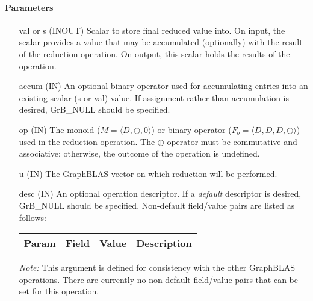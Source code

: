 \paragraph{Parameters}

\begin{itemize}[leftmargin=1.1in]
    \item[{\sf val} or {\sf s}] ({\sf INOUT}) Scalar to store final reduced value into. On input,
    the scalar provides a value that may be accumulated (optionally) with the result of the
    reduction operation.  On output, this scalar holds the results of the
    operation.

    \item[{\sf accum}] ({\sf IN}) An optional binary operator used for accumulating
    entries into an existing scalar ({\sf s} or {\sf val}) value. If assignment rather than accumulation is
    desired, {\sf GrB\_NULL} should be specified.

    \item[{\sf op}]    ({\sf IN}) The monoid ($M = \langle D,\oplus,0 \rangle$) or binary operator 
    ($F_b = \langle D, D, D, \oplus \rangle$) used in the reduction operation. The $\oplus$ operator 
    must be commutative and associative; otherwise, the outcome of the operation is undefined.  
    
    \item[{\sf u}]     ({\sf IN}) The GraphBLAS vector on which
    reduction will be performed.

    \item[{\sf desc}] ({\sf IN}) An optional operation descriptor. If
    a \emph{default} descriptor is desired, {\sf GrB\_NULL} should be
    specified. Non-default field/value pairs are listed as follows:  \\

    \begin{tabular}{lllp{2.5in}}
        Param & Field  & Value & Description \\
        \hline
    \end{tabular}

    \emph{Note:} This argument is defined for consistency with the other GraphBLAS operations.
    There are currently no non-default field/value pairs that can be set for this operation.
\end{itemize}

